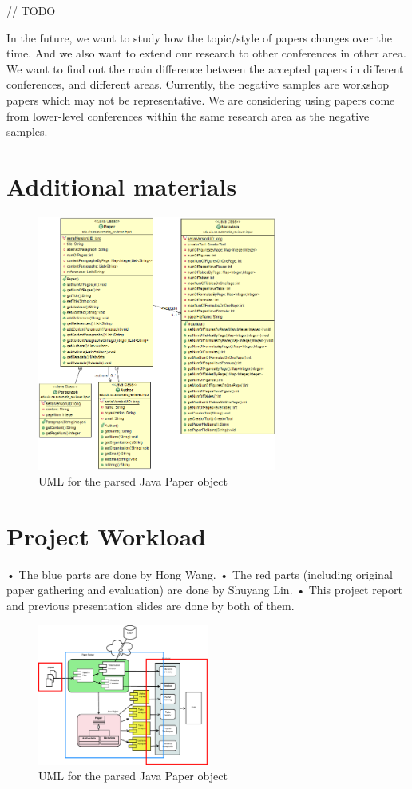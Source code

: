\documentclass[11pt,letterpaper]{article}
\begin{document}
// TODO


In the future, we want to study how the topic/style of papers changes over the time. And we also want to extend our research to other conferences in other area. We want to find out the main difference between the accepted papers in different conferences, and different areas. 
Currently, the negative samples are workshop papers which may not be representative.  We are considering using papers come from lower-level conferences within the same research area as the negative samples. 



\begin{appendices}
\chapter{Additional materials}
\begin{figure}[htb]
  \centering
	 	 \includegraphics[width=0.7\textwidth]{materials/paper_uml.png}
		\caption{UML for the parsed Java Paper object}
		\label{fig:uml}
\end{figure}



\chapter{Project Workload}
•	The blue parts are done by Hong Wang.
•	The red parts (including original paper gathering and evaluation) are done by Shuyang Lin.
•	This project report and previous presentation slides are done by both of them. 

\begin{figure}[htb]
  \centering
	 	 \includegraphics[width=0.5\textwidth]{materials/workload.eps}
		\caption{UML for the parsed Java Paper object}
		\label{fig:workload}
\end{figure}



\end{appendices}
\end{document}
